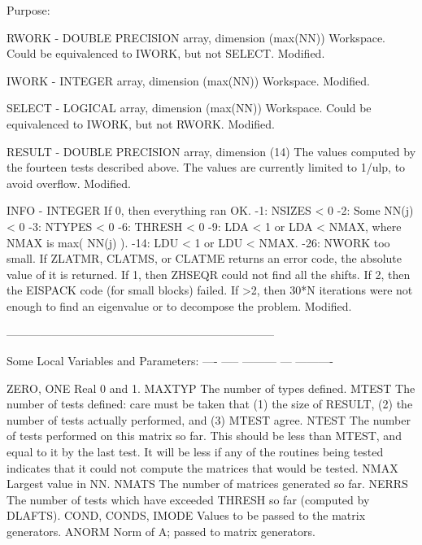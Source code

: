 \begin{DoxyParagraph}{Purpose\+: }
\begin{DoxyVerb}
  RWORK  - DOUBLE PRECISION array, dimension (max(NN))
           Workspace.  Could be equivalenced to IWORK, but not SELECT.
           Modified.

  IWORK  - INTEGER array, dimension (max(NN))
           Workspace.
           Modified.

  SELECT - LOGICAL array, dimension (max(NN))
           Workspace.  Could be equivalenced to IWORK, but not RWORK.
           Modified.

  RESULT - DOUBLE PRECISION array, dimension (14)
           The values computed by the fourteen tests described above.
           The values are currently limited to 1/ulp, to avoid
           overflow.
           Modified.

  INFO   - INTEGER
           If 0, then everything ran OK.
            -1: NSIZES < 0
            -2: Some NN(j) < 0
            -3: NTYPES < 0
            -6: THRESH < 0
            -9: LDA < 1 or LDA < NMAX, where NMAX is max( NN(j) ).
           -14: LDU < 1 or LDU < NMAX.
           -26: NWORK too small.
           If  ZLATMR, CLATMS, or CLATME returns an error code, the
               absolute value of it is returned.
           If 1, then ZHSEQR could not find all the shifts.
           If 2, then the EISPACK code (for small blocks) failed.
           If >2, then 30*N iterations were not enough to find an
               eigenvalue or to decompose the problem.
           Modified.

-----------------------------------------------------------------------

     Some Local Variables and Parameters:
     ---- ----- --------- --- ----------

     ZERO, ONE       Real 0 and 1.
     MAXTYP          The number of types defined.
     MTEST           The number of tests defined: care must be taken
                     that (1) the size of RESULT, (2) the number of
                     tests actually performed, and (3) MTEST agree.
     NTEST           The number of tests performed on this matrix
                     so far.  This should be less than MTEST, and
                     equal to it by the last test.  It will be less
                     if any of the routines being tested indicates
                     that it could not compute the matrices that
                     would be tested.
     NMAX            Largest value in NN.
     NMATS           The number of matrices generated so far.
     NERRS           The number of tests which have exceeded THRESH
                     so far (computed by DLAFTS).
     COND, CONDS,
     IMODE           Values to be passed to the matrix generators.
     ANORM           Norm of A; passed to matrix generators.


\end{DoxyVerb}
\end{DoxyParagraph}
